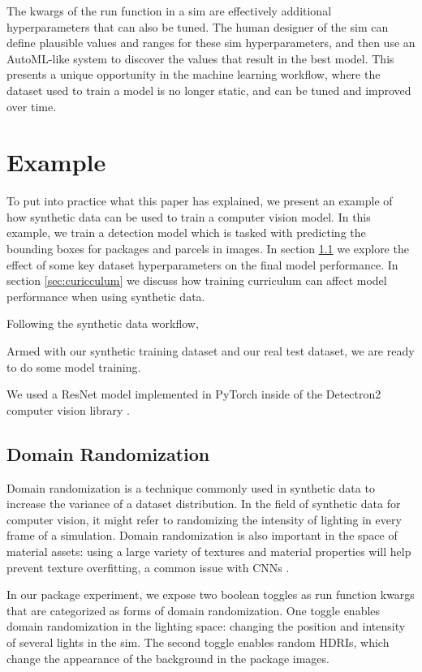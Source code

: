 \documentclass{article}
\begin{document}
The kwargs of the run function in a sim are effectively additional hyperparameters that can also be tuned. The human designer of the sim can define plausible values and ranges for these sim hyperparameters, and then use an AutoML-like system to discover the values that result in the best model. This presents a unique opportunity in the machine learning workflow, where the dataset used to train a model is no longer static, and can be tuned and improved over time.

\section{Example}
\label{sec:example}

To put into practice what this paper has explained, we present an example of how synthetic data can be used to train a computer vision model. In this example, we train a detection model which is tasked with predicting the bounding boxes for packages and parcels in images. In section \ref{sec:domainrandomization} we explore the effect of some key dataset hyperparameters on the final model performance. In section \ref{sec:curicculum} we discuss how training curriculum can affect model performance when using synthetic data.

Following the synthetic data workflow,

Armed with our synthetic training dataset and our real test dataset, we are ready to do some model training.

We used a ResNet model implemented in PyTorch inside of the Detectron2 computer vision library \cite{wu2019detectron2}.


\subsection{Domain Randomization}
\label{sec:domainrandomization}

Domain randomization is a technique commonly used in synthetic data to increase the variance of a dataset distribution. In the field of synthetic data for computer vision, it might refer to randomizing the intensity of lighting in every frame of a simulation. Domain randomization is also important in the space of material assets: using a large variety of textures and material properties will help prevent texture overfitting, a common issue with CNNs \cite{DBLP:journals/corr/abs-1811-12231}. 

In our package experiment, we expose two boolean toggles as run function kwargs that are categorized as forms of domain randomization. One toggle enables domain randomization in the lighting space: changing the position and intensity of several lights in the sim. The second toggle enables random HDRIs, which change the appearance of the background in the package images.
\end{document}
